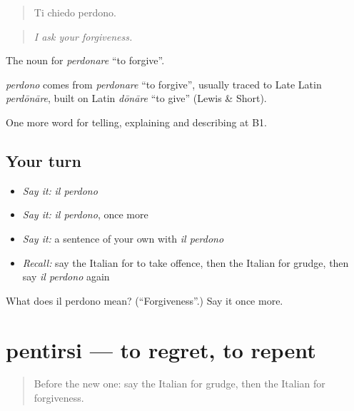 \begin{quote}
Ti chiedo perdono.
\end{quote}

\begin{quote}
\emph{I ask your forgiveness.}
\end{quote}

The noun for \emph{perdonare} \textquotedblleft{}to forgive\textquotedblright{}.

\begin{cousinweb}
\emph{perdono} comes from \emph{perdonare} \textquotedblleft{}to forgive\textquotedblright{}, usually traced to Late Latin \emph{perdōnāre}, built on Latin \emph{dōnāre} \textquotedblleft{}to give\textquotedblright{} (Lewis \& Short).
\end{cousinweb}

\begin{grammarlens}[title={What you've built}]
One more word for telling, explaining and describing at B1.
\end{grammarlens}

\subsection*{Your turn}
\begin{itemize}
\raggedright
  \item \emph{Say it:} \emph{il perdono}
  \item \emph{Say it:} \emph{il perdono}, once more
  \item \emph{Say it:} a sentence of your own with \emph{il perdono}
  \item \emph{Recall:} say the Italian for to take offence, then the Italian for grudge, then say \emph{il perdono} again
\end{itemize}

\begin{tcolorbox}[breakable,colback=teal!4,colframe=teal!35!black,title={Before you move on}]
What does il perdono mean? (\textquotedblleft{}Forgiveness\textquotedblright{}.) Say it once more.
\end{tcolorbox}
\section[pentirsi]{pentirsi — to regret, to repent}

\label{lesson:IT-C480-pentirsi}



\begin{quote}
Before the new one: say the Italian for grudge, then the Italian for forgiveness.
\end{quote}

